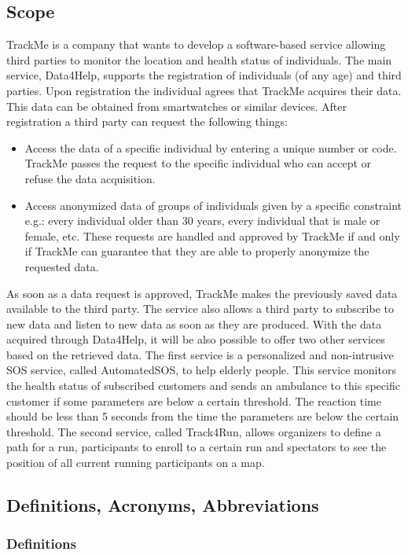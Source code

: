 \documentclass[12pt]{article}
\begin{document}
\subsection{Scope}
TrackMe is a company that wants to develop a software-based service allowing third parties to monitor the location and health status of individuals. The main service, Data4Help, supports the registration of individuals (of any age) and third parties. Upon registration the individual agrees that TrackMe acquires their data. This data can be obtained from smartwatches or similar devices. After registration a third party can request the following things:
\begin{itemize}
\item Access the data of a specific individual by entering a unique number or code. TrackMe passes the request to the specific individual who can accept or refuse the data acquisition.
\item Access anonymized data of groups of individuals given by a specific constraint e.g.: every individual older than 30 years, every individual that is male or female, etc. These requests are handled and approved by TrackMe if and only if TrackMe can guarantee that they are able to properly anonymize the requested data.
\end{itemize}
As soon as a data request is approved, TrackMe makes the previously saved data available to the third party. The service also allows a third party to subscribe to new data and listen to new data as soon as they are produced. With the data acquired through Data4Help, it will be also possible to offer two other services based on the retrieved data. The first service is a personalized and non-intrusive SOS service, called AutomatedSOS, to help elderly people. This service monitors the health status of subscribed customers and sends an ambulance to this specific customer if some parameters are below a certain threshold. The reaction time should be less than 5 seconds from the time the parameters are below the certain threshold.
The second service, called Track4Run, allows organizers to define a path for a run, participants to enroll to a certain run and spectators to see the position of all current running participants on a map.


\subsection{Definitions, Acronyms, Abbreviations}

\subsubsection{Definitions}
\end{document}
